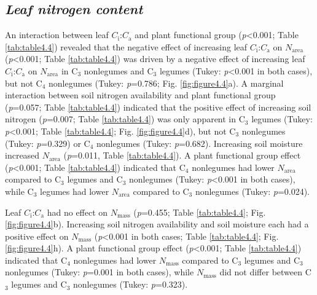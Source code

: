 \subsection{\textit{Leaf nitrogen content}}
\noindent An interaction between leaf $C_\mathrm{i}$:$C_\mathrm{a}$ and plant functional group (\textit{p}<0.001; Table \ref{tab:table4.4}) revealed that the negative effect of increasing leaf $C_\mathrm{i}$:$C_\mathrm{a}$ on $N_\mathrm{area}$ (\textit{p}<0.001; Table \ref{tab:table4.4}) was driven by a negative effect of increasing leaf $C_\mathrm{i}$:$C_\mathrm{a}$ on $N_\mathrm{area}$ in C$_3$ nonlegumes and C$_3$ legumes (Tukey: \textit{p}<0.001 in both cases), but not C$_4$ nonlegumes (Tukey: \textit{p}=0.786; Fig. \ref{fig:figure4.4}a). A marginal interaction between soil nitrogen availability and plant functional group (\textit{p}=0.057; Table \ref{tab:table4.4}) indicated that the positive effect of increasing soil nitrogen (\textit{p}=0.007; Table \ref{tab:table4.4}) was only apparent in C$_3$ legumes (Tukey: \textit{p}<0.001; Table \ref{tab:table4.4}; Fig. \ref{fig:figure4.4}d), but not C$_3$ nonlegumes (Tukey: \textit{p}=0.329) or C$_4$ nonlegumes (Tukey: \textit{p}=0.682). Increasing soil moisture increased $N_\mathrm{area}$ (\textit{p}=0.011, Table \ref{tab:table4.4}). A plant functional group effect (\textit{p}<0.001; Table \ref{tab:table4.4}) indicated that C$_4$ nonlegumes had lower $N_\mathrm{area}$ compared to C$_3$ legumes and C$_3$ nonlegumes (Tukey: \textit{p}<0.001 in both cases), while C$_3$ legumes had lower $N_\mathrm{area}$ compared to C$_3$ nonlegumes (Tukey: \textit{p}=0.024).

Leaf $C_\mathrm{i}$:$C_\mathrm{a}$ had no effect on $N_\mathrm{mass}$ (\textit{p}=0.455; Table \ref{tab:table4.4}; Fig. \ref{fig:figure4.4}b). Increasing soil nitrogen availability and soil moisture each had a positive effect on $N_\mathrm{mass}$ (\textit{p}<0.001 in both cases; Table \ref{tab:table4.4}; Fig. \ref{fig:figure4.4}h). A plant functional group effect (\textit{p}<0.001; Table \ref{tab:table4.4}) indicated that C$_4$ nonlegumes had lower $N_\mathrm{mass}$ compared to C$_3$ legumes and C$_3$ nonlegumes (Tukey: \textit{p}=0.001 in both cases), while $N_\mathrm{mass}$ did not differ between C$_3$ legumes and C$_3$ nonlegumes (Tukey: \textit{p}=0.323).

